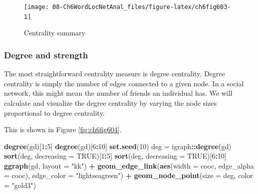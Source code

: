 \documentclass[
]{article}
\newenvironment{Shaded}{\begin{snugshade}}{\end{snugshade}}
\newcommand{\AttributeTok}[1]{\textcolor[rgb]{0.13,0.29,0.53}{#1}}
\newcommand{\ConstantTok}[1]{\textcolor[rgb]{0.56,0.35,0.01}{#1}}
\newcommand{\DecValTok}[1]{\textcolor[rgb]{0.00,0.00,0.81}{#1}}
\newcommand{\FunctionTok}[1]{\textcolor[rgb]{0.13,0.29,0.53}{\textbf{#1}}}
\newcommand{\NormalTok}[1]{#1}
\newcommand{\OtherTok}[1]{\textcolor[rgb]{0.56,0.35,0.01}{#1}}
\newcommand{\SpecialCharTok}[1]{\textcolor[rgb]{0.81,0.36,0.00}{\textbf{#1}}}
\newcommand{\StringTok}[1]{\textcolor[rgb]{0.31,0.60,0.02}{#1}}
\begin{document}
\begin{figure}

{\centering \texttt{[image: 08-Ch6WordLocNetAnal\_files/figure-latex/ch6fig603-1]} 

}

\caption{Centrality summary}\label{fig:ch6fig603}
\end{figure}

\hypertarget{degree-and-strength}{%
\subsubsection{Degree and strength}\label{degree-and-strength}}

The most straightforward centrality measure is degree centrality. Degree centrality is simply the number of edges connected to a given node. In a social network, this might mean the number of friends an individual has. We will calculate and visualize the degree centrality by varying the node sizes proportional to degree centrality.

This is shown in Figure \ref{fig:ch6fig604}.

\begin{Shaded}
\begin{Highlighting}[]
\FunctionTok{degree}\NormalTok{(gd)[}\DecValTok{1}\SpecialCharTok{:}\DecValTok{5}\NormalTok{]}
\FunctionTok{degree}\NormalTok{(gd)[}\DecValTok{6}\SpecialCharTok{:}\DecValTok{10}\NormalTok{]}
\FunctionTok{set.seed}\NormalTok{(}\DecValTok{10}\NormalTok{)}
\NormalTok{deg }\OtherTok{=}\NormalTok{ igraph}\SpecialCharTok{::}\FunctionTok{degree}\NormalTok{(gd)}
\FunctionTok{sort}\NormalTok{(deg, }\AttributeTok{decreasing =} \ConstantTok{TRUE}\NormalTok{)[}\DecValTok{1}\SpecialCharTok{:}\DecValTok{5}\NormalTok{]}
\FunctionTok{sort}\NormalTok{(deg, }\AttributeTok{decreasing =} \ConstantTok{TRUE}\NormalTok{)[}\DecValTok{6}\SpecialCharTok{:}\DecValTok{10}\NormalTok{]}
\FunctionTok{ggraph}\NormalTok{(gd, }\AttributeTok{layout =} \StringTok{"kk"}\NormalTok{) }\SpecialCharTok{+}
  \FunctionTok{geom\_edge\_link}\NormalTok{(}\FunctionTok{aes}\NormalTok{(}\AttributeTok{width =}\NormalTok{ cooc, }\AttributeTok{edge\_alpha =}\NormalTok{ cooc), }
                 \AttributeTok{edge\_color =} \StringTok{"lightseagreen"}\NormalTok{) }\SpecialCharTok{+}
  \FunctionTok{geom\_node\_point}\NormalTok{(}\AttributeTok{size =}\NormalTok{ deg, }\AttributeTok{color =} \StringTok{"gold3"}\NormalTok{)}
\end{Highlighting}
\end{Shaded}
\end{document}
